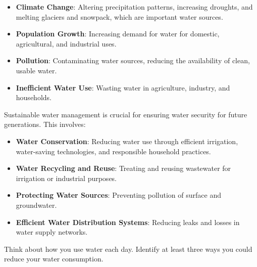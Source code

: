 \begin{itemize}
    \item \textbf{Climate Change}:  Altering precipitation patterns, increasing droughts, and melting glaciers and snowpack, which are important water sources.
    \item \textbf{Population Growth}: Increasing demand for water for domestic, agricultural, and industrial uses.
    \item \textbf{Pollution}: Contaminating water sources, reducing the availability of clean, usable water.
    \item \textbf{Inefficient Water Use}:  Wasting water in agriculture, industry, and households.
\end{itemize}

Sustainable water management is crucial for ensuring water security for future generations.  This involves:

\begin{itemize}
    \item \textbf{Water Conservation}: Reducing water use through efficient irrigation, water-saving technologies, and responsible household practices.
    \item \textbf{Water Recycling and Reuse}: Treating and reusing wastewater for irrigation or industrial purposes.
    \item \textbf{Protecting Water Sources}: Preventing pollution of surface and groundwater.
    \item \textbf{Efficient Water Distribution Systems}: Reducing leaks and losses in water supply networks.
\end{itemize}


\begin{stopandthink}
Think about how you use water each day.  Identify at least three ways you could reduce your water consumption.
\end{stopandthink}

